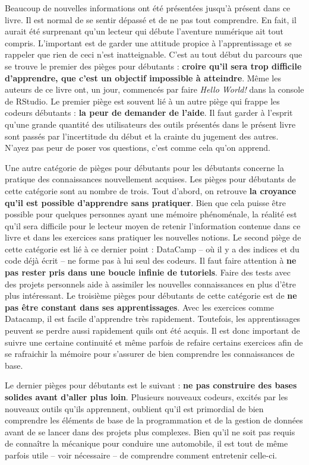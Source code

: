 \documentclass[
  letterpaper,
  DIV=11,
  numbers=noendperiod]{scrreprt}
\begin{document}
Beaucoup de nouvelles informations ont été présentées jusqu'à présent
dans ce livre. Il est normal de se sentir dépassé et de ne pas tout
comprendre. En fait, il aurait été surprenant qu'un lecteur qui débute
l'aventure numérique ait tout compris. L'important est de garder une
attitude propice à l'apprentissage et se rappeler que rien de ceci n'est
inatteignable. C'est au tout début du parcours que se trouve le premier
des pièges pour débutants : \textbf{croire qu'il sera trop difficile
d'apprendre, que c'est un objectif impossible à atteindre}. Même les
auteurs de ce livre ont, un jour, commencés par faire \emph{Hello
World!} dans la console de RStudio. Le premier piège est souvent lié à
un autre piège qui frappe les codeurs débutants : \textbf{la peur de
demander de l'aide}. Il faut garder à l'esprit qu'une grande quantité
des utilisateurs des outils présentés dans le présent livre sont passés
par l'incertitude du début et la crainte du jugement des autres. N'ayez
pas peur de poser vos questions, c'est comme cela qu'on apprend.

Une autre catégorie de pièges pour débutants pour les débutants concerne
la pratique des connaissances nouvellement acquises. Les pièges pour
débutants de cette catégorie sont au nombre de trois. Tout d'abord, on
retrouve \textbf{la croyance qu'il est possible d'apprendre sans
pratiquer}. Bien que cela puisse être possible pour quelques personnes
ayant une mémoire phénoménale, la réalité est qu'il sera difficile pour
le lecteur moyen de retenir l'information contenue dans ce livre et dans
les exercices sans pratiquer les nouvelles notions. Le second piège de
cette catégorie est lié à ce dernier point : DataCamp -- où il y a des
indices et du code déjà écrit -- ne forme pas à lui seul des codeurs. Il
faut faire attention à \textbf{ne pas rester pris dans une boucle
infinie de tutoriels}. Faire des tests avec des projets personnels aide
à assimiler les nouvelles connaissances en plus d'être plus intéressant.
Le troisième pièges pour débutants de cette catégorie est de \textbf{ne
pas être constant dans ses apprentissages}. Avec les exercices comme
Datacamp, il est facile d'apprendre très rapidement. Toutefois, les
apprentissages peuvent se perdre aussi rapidement qu\textquotesingle ils
ont été acquis. Il est donc important de suivre une certaine continuité
et même parfois de refaire certains exercices afin de se rafraichir la
mémoire pour s'assurer de bien comprendre les connaissances de base.

Le dernier pièges pour débutants est le suivant : \textbf{ne pas
construire des bases solides avant d'aller plus loin}. Plusieurs
nouveaux codeurs, excités par les nouveaux outils qu'ils apprennent,
oublient qu'il est primordial de bien comprendre les éléments de base de
la programmation et de la gestion de données avant de se lancer dans des
projets plus complexes. Bien qu'il ne soit pas requis de connaître la
mécanique pour conduire une automobile, il est tout de même parfois
utile -- voir nécessaire -- de comprendre comment entretenir celle-ci.
\end{document}
